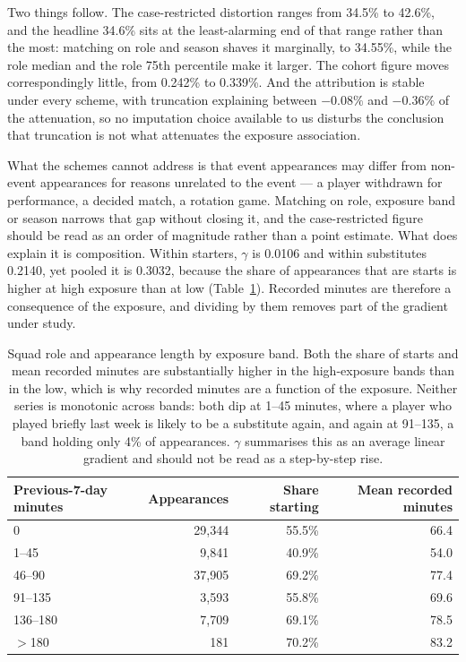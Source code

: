 \documentclass[11pt]{article}
\begin{document}
Two things follow. The case-restricted distortion ranges from 34.5\% to 42.6\%, and the headline 34.6\% sits at the least-alarming end of that range rather than the most: matching on role and season shaves it marginally, to 34.55\%, while the role median and the role 75th percentile make it larger. The cohort figure moves correspondingly little, from 0.242\% to 0.339\%. And the attribution is stable under every scheme, with truncation explaining between $-0.08\%$ and $-0.36\%$ of the attenuation, so no imputation choice available to us disturbs the conclusion that truncation is not what attenuates the exposure association.

What the schemes cannot address is that event appearances may differ from non-event appearances for reasons unrelated to the event --- a player withdrawn for performance, a decided match, a rotation game. Matching on role, exposure band or season narrows that gap without closing it, and the case-restricted figure should be read as an order of magnitude rather than a point estimate. What does explain it is composition. Within starters, $\gamma$ is 0.0106 and within substitutes 0.2140, yet pooled it is 0.3032, because the share of appearances that are starts is higher at high exposure than at low (Table~\ref{tab:supp_composition}). Recorded minutes are therefore a consequence of the exposure, and dividing by them removes part of the gradient under study.

\begin{table}[h]
\centering
\caption{Squad role and appearance length by exposure band. Both the share of starts and mean recorded minutes are substantially higher in the high-exposure bands than in the low, which is why recorded minutes are a function of the exposure. Neither series is monotonic across bands: both dip at 1--45 minutes, where a player who played briefly last week is likely to be a substitute again, and again at 91--135, a band holding only 4\% of appearances. $\gamma$ summarises this as an average linear gradient and should not be read as a step-by-step rise.}
\label{tab:supp_composition}
\small
\begin{tabular}{lrrr}
\toprule
Previous-7-day minutes & Appearances & Share starting & Mean recorded minutes\\
\midrule
0 & 29,344 & 55.5\% & 66.4\\
1--45 & 9,841 & 40.9\% & 54.0\\
46--90 & 37,905 & 69.2\% & 77.4\\
91--135 & 3,593 & 55.8\% & 69.6\\
136--180 & 7,709 & 69.1\% & 78.5\\
$>$180 & 181 & 70.2\% & 83.2\\
\bottomrule
\end{tabular}
\end{table}
\end{document}
